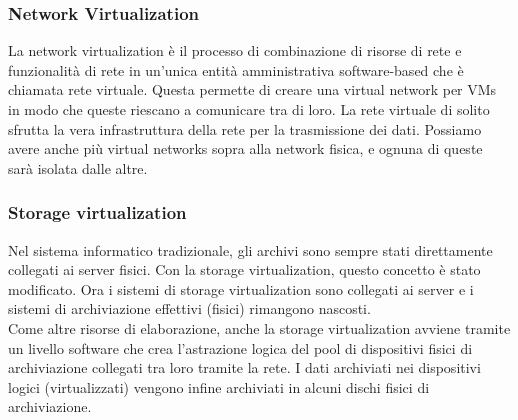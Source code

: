 \documentclass{article}
\begin{document}
\subsubsection{Network Virtualization}
La network virtualization è il processo di combinazione di risorse di rete e funzionalità di rete in un'unica entità amministrativa software-based che è chiamata rete virtuale. Questa permette di creare una virtual network per VMs in modo che queste riescano a comunicare tra di loro. La rete virtuale di solito sfrutta la vera infrastruttura della rete per la trasmissione dei dati. Possiamo avere anche più virtual networks sopra alla network fisica, e ognuna di queste sarà isolata dalle altre.

\subsubsection{Storage virtualization}
Nel sistema informatico tradizionale, gli archivi sono sempre stati direttamente collegati ai server fisici. Con la storage virtualization, questo concetto è stato modificato. Ora i sistemi di storage virtualization sono collegati ai server e i sistemi di archiviazione effettivi (fisici) rimangono nascosti. \\
Come altre risorse di elaborazione, anche la storage virtualization avviene tramite un livello software che crea l'astrazione logica del pool di dispositivi fisici di archiviazione collegati tra loro tramite la rete. I dati archiviati nei dispositivi logici (virtualizzati) vengono infine archiviati in alcuni dischi fisici di archiviazione.
\end{document}
